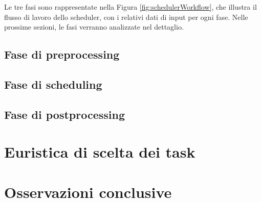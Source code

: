 Le tre fasi sono rappresentate nella Figura \ref{fig:schedulerWorkflow}, che 
illustra il flusso di lavoro dello scheduler, con i relativi dati di input per 
ogni fase. Nelle prossime sezioni, le fasi verranno analizzate nel dettaglio.


\subsection{Fase di preprocessing}


\subsection{Fase di scheduling}


\subsection{Fase di postprocessing}


\section{Euristica di scelta dei task}
\label{sec:euristicaSceltaTask}


\section{Osservazioni conclusive}
\label{sec:osservazioniConclusive}
